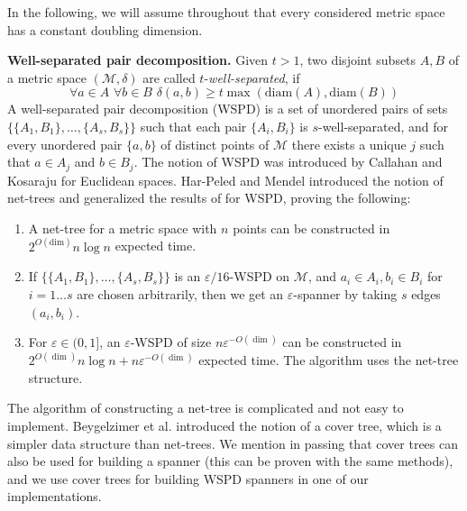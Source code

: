 \documentclass[a4paper,UKenglish,cleveref, autoref]{lipics-v2019}
\newcommand{\eps}{\varepsilon}
\newcommand{\metricspace}{\mathcal{M}}
\newcommand{\diam}{\mathrm{diam}}
\newcommand{\dist}{\delta}
\newcommand{\myparagraph}[1]{\textbf{#1.}}
\def\marrow{\marginpar[\hfill$\longrightarrow$]{$\longleftarrow$}}
\def\michael#1{\textcolor{red}{\textsc{Michael says: }{\marrow\sf #1}}}
\begin{document}
In the following, we will assume throughout that every considered metric space
has a constant doubling dimension.

\myparagraph{Well-separated pair decomposition}
Given $t > 1$, two disjoint subsets $A, B$ of a metric space $(\metricspace, \dist)$ are called $t$-\textit{well-separated},
if 
\[
\forall a \in A \,\, \forall b \in B \,\, \dist(a, b) \geq t \max(\diam(A), \diam(B))
\]
A well-separated pair decomposition (WSPD) is a set of unordered pairs of sets $\{ \{A_1, B_1 \}, 
\dots, \{A_s, B_s\} \}$ such that each pair $\{A_i, B_i\}$ is $s$-well-separated, and for every unordered pair $\{a, b\}$ of distinct points of $\metricspace$ there exists a unique $j$ such that $a \in A_j$ and $b \in B_j$.
The notion of WSPD was introduced by Callahan and Kosaraju \cite{cal-kos-wspd} for Euclidean spaces.
Har-Peled and Mendel \cite{hm-fast} 
introduced the notion of net-trees and
generalized the results of \cite{cal-kos-wspd} for WSPD, proving the following:
\begin{enumerate}
    \item A net-tree for a metric space with $n$ points can be constructed in $2^{O(\mbox{dim})} n \log n$ expected time.
    \item If $\{ \{A_1, B_1 \}, 
\dots, \{A_s, B_s\} \}$ is an $\eps / 16$-WSPD on $\metricspace$, and $a_i \in A_i, b_i \in B_i$ for $i = 1\dots s$
are chosen arbitrarily, then we get an $\eps$-spanner by taking $s$ edges $(a_i, b_i)$.
    \item For $\eps \in (0, 1]$,  an $\eps$-WSPD of size $n \eps^{-O({\dim})}$ can be constructed in $2^{O({\dim})} n \log n + n \eps ^{-O({\dim})}$ expected time. The algorithm uses the net-tree structure.
\end{enumerate}
The algorithm of constructing a net-tree is complicated and not easy to implement. Beygelzimer
et al. \cite{cover-trees} introduced the notion of a cover tree, which is a simpler data structure 
than net-trees. We mention in passing that cover trees can also be used for building
a spanner (this can be proven with the same methods), and we use cover trees for
building WSPD spanners in one of our implementations.
\end{document}
